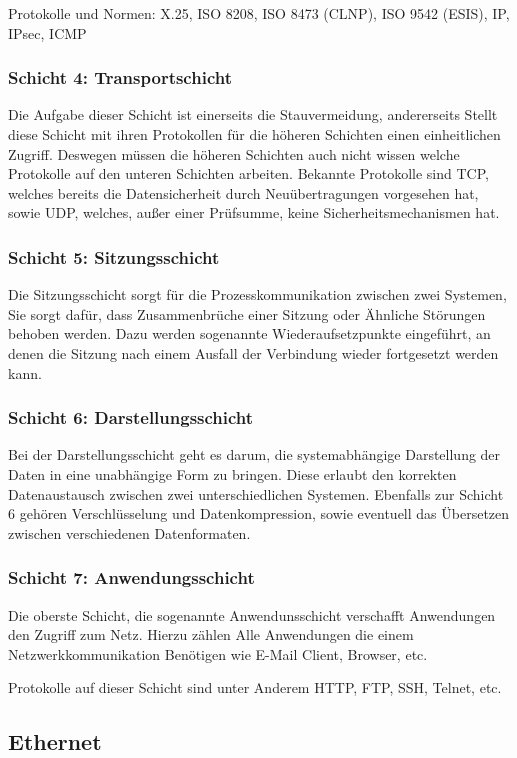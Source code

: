 \documentclass[a4paper,14pt,headsepline]{scrartcl}
\begin{document}
Protokolle und Normen: X.25, ISO 8208, ISO 8473 (CLNP), ISO 9542 (ESIS), IP, IPsec, ICMP

\subsubsection{Schicht 4: Transportschicht}
Die Aufgabe dieser Schicht ist einerseits die Stauvermeidung, andererseits Stellt diese Schicht mit ihren Protokollen für die höheren Schichten einen einheitlichen Zugriff. Deswegen müssen die höheren Schichten auch nicht wissen welche Protokolle auf den unteren Schichten arbeiten. Bekannte Protokolle sind TCP, welches bereits die Datensicherheit durch Neuübertragungen vorgesehen hat, sowie UDP, welches, außer einer Prüfsumme, keine Sicherheitsmechanismen hat.

\subsubsection{Schicht 5: Sitzungsschicht}
Die Sitzungsschicht sorgt für die Prozesskommunikation zwischen zwei Systemen, Sie sorgt dafür, dass Zusammenbrüche einer Sitzung oder Ähnliche Störungen behoben werden. Dazu werden sogenannte Wiederaufsetzpunkte eingeführt, an denen die Sitzung nach einem Ausfall der Verbindung wieder fortgesetzt werden kann.

\subsubsection{Schicht 6: Darstellungsschicht}
Bei der Darstellungsschicht geht es darum, die systemabhängige Darstellung der Daten in eine unabhängige Form zu bringen. Diese erlaubt den korrekten Datenaustausch zwischen zwei unterschiedlichen Systemen. Ebenfalls zur Schicht 6 gehören Verschlüsselung und Datenkompression, sowie eventuell das Übersetzen zwischen verschiedenen Datenformaten.

\subsubsection{Schicht 7: Anwendungsschicht}
Die oberste Schicht, die sogenannte Anwendunsschicht verschafft Anwendungen den Zugriff zum Netz. Hierzu zählen Alle Anwendungen die einem Netzwerkkommunikation Benötigen wie E-Mail Client, Browser, etc.

Protokolle auf dieser Schicht sind unter Anderem HTTP, FTP, SSH, Telnet, etc.
 
\subsection{Ethernet}
\end{document}
